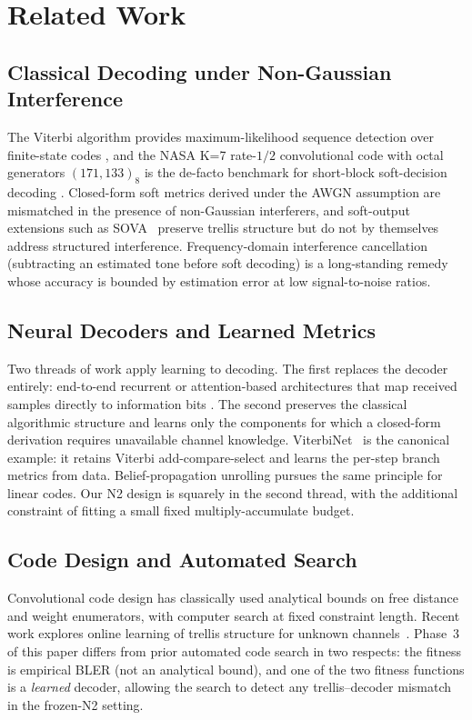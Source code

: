 \documentclass[conference]{IEEEtran}
\begin{document}
\section{Related Work}

\subsection{Classical Decoding under Non-Gaussian Interference}
The Viterbi algorithm provides maximum-likelihood sequence detection over
finite-state codes \cite{viterbi1967}, and the NASA K=7 rate-$1/2$
convolutional code with octal generators $(171,133)_8$ is the de-facto
benchmark for short-block soft-decision decoding
\cite{nasastandard,proakis2008}.  Closed-form soft metrics derived under
the AWGN assumption are mismatched in the presence of
non-Gaussian interferers, and soft-output extensions such as
SOVA~\cite{hagenauer1989} preserve trellis structure but do not by
themselves address structured interference.  Frequency-domain
interference cancellation (subtracting an estimated tone before
soft decoding) is a long-standing remedy whose accuracy is bounded by
estimation error at low signal-to-noise ratios.

\subsection{Neural Decoders and Learned Metrics}
Two threads of work apply learning to decoding.  The first replaces the
decoder entirely: end-to-end recurrent or attention-based architectures
that map received samples directly to information bits
\cite{gruber2017,kim2018,kargi2024}.  The second preserves the classical
algorithmic structure and learns only the components for which a
closed-form derivation requires unavailable channel knowledge.
ViterbiNet~\cite{shlezinger2020} is the canonical example: it retains
Viterbi add-compare-select and learns the per-step branch metrics from
data.  Belief-propagation unrolling \cite{nachmani2018} pursues the same
principle for linear codes.  Our N2 design is squarely in the second
thread, with the additional constraint of fitting a small fixed
multiply-accumulate budget.

\subsection{Code Design and Automated Search}
Convolutional code design has classically used analytical bounds on free
distance and weight enumerators, with computer search at fixed constraint
length.  Recent work explores online learning of trellis structure for
unknown channels~\cite{yang2022}.  Phase~3 of this paper differs from
prior automated code search in two respects: the fitness is empirical
BLER (not an analytical bound), and one of the two fitness functions is a
\emph{learned} decoder, allowing the search to detect any
trellis--decoder mismatch in the frozen-N2 setting.
\end{document}
